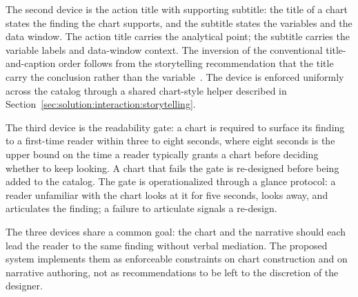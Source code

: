 The second device is the action title with supporting subtitle: the
title of a chart states the finding the chart supports, and the
subtitle states the variables and the data window. The action title
carries the analytical point; the subtitle carries the variable labels
and data-window context. The inversion of the conventional title-and-caption order
follows from the storytelling recommendation that the title carry
the conclusion rather than the variable~\cite{knaflic2015}. The device is enforced
uniformly across the catalog through a shared chart-style helper
described in Section~\ref{sec:solution:interaction:storytelling}.

The third device is the readability gate: a chart is required to
surface its finding to a first-time reader within three to eight
seconds, where eight seconds is the upper bound on the time a reader
typically grants a chart before deciding whether to keep looking. A
chart that fails the gate is re-designed before being added to the
catalog. The gate is operationalized through a glance protocol: a
reader unfamiliar with the chart looks at it for five seconds, looks
away, and articulates the finding; a failure to articulate signals a
re-design.

The three devices share a common goal: the chart and the narrative
should each lead the reader to the same finding without verbal
mediation. The proposed system implements them as enforceable
constraints on chart construction and on narrative authoring, not as
recommendations to be left to the discretion of the designer.
